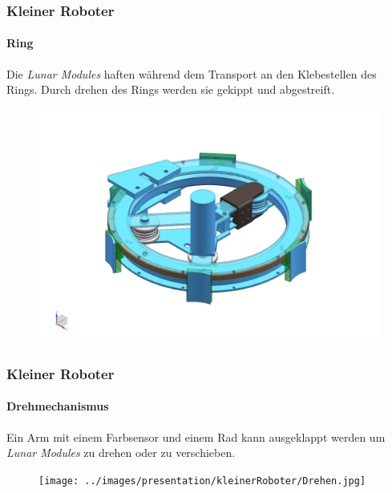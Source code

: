 \begin{frame}
	\frametitle{Kleiner Roboter}
	\framesubtitle{Ring}
	Die \textit{Lunar Modules} haften während dem Transport an den Klebestellen des Rings.
	Durch drehen des Rings werden sie gekippt und abgestreift.
	\begin{figure}
		\centering
		\includegraphics[height = 4 cm]{../images/presentation/kleinerRoboter/Ring.png}
	\end{figure}
\end{frame}

\begin{frame}
	\frametitle{Kleiner Roboter}
	\framesubtitle{Drehmechanismus}
	Ein Arm mit einem Farbsensor und einem Rad kann ausgeklappt werden um \textit{Lunar Modules} zu drehen oder zu verschieben.
	\begin{figure}
		\centering
		\texttt{[image: ../images/presentation/kleinerRoboter/Drehen.jpg]}
	\end{figure}
\end{frame}